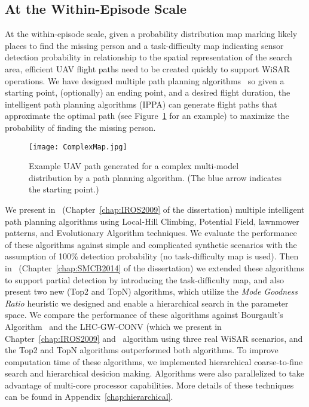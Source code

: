 \subsection{At the Within-Episode Scale}

At the within-episode scale, given a probability distribution map marking likely places to find the missing person and a task-difficulty map indicating sensor detection probability in relationship to the spatial representation of the search area, efficient UAV flight paths need to be created quickly to support WiSAR operations. We have designed multiple path planning algorithms~\cite{Lin2009UAV,Lin2014Hierarchical} so given a starting point, (optionally) an ending point, and a desired flight duration, the intelligent path planning algorithms (IPPA) can generate flight paths that approximate the optimal path (see Figure~\ref{path} for an example) to maximize the probability of finding the missing person.

\begin{figure}
\centering
\texttt{[image: ComplexMap.jpg]}
\caption{Example UAV path generated for a complex multi-model distribution by a path planning algorithm. (The blue arrow indicates the starting point.)}
\label{path}
\end{figure}

We present in~\cite{Lin2009UAV} (Chapter~\ref{chap:IROS2009} of the dissertation) multiple intelligent path planning algorithms using Local-Hill Climbing, Potential Field, lawnmower patterns, and Evolutionary Algorithm techniques. We evaluate the performance of these algorithms against simple and complicated synthetic scenarios with the assumption of 100\% detection probability (no task-difficulty map is used). Then in~\cite{Lin2014Hierarchical} (Chapter~\ref{chap:SMCB2014} of the dissertation) we extended these algorithms to support partial detection by introducing the task-difficulty map, and also present two new (Top2 and TopN) algorithms, which utilize the \textit{Mode Goodness Ratio} heuristic we designed and enable a hierarchical search in the parameter space. We compare the performance of these algorithms against Bourgault's Algorithm~\cite{Bourgault2006Optimal} and the LHC-GW-CONV (which we present in Chapter~\ref{chap:IROS2009} and~\cite{Lin2009UAV} algorithm using three real WiSAR scenarios, and the Top2 and TopN algorithms outperformed both algorithms. To improve computation time of these algorithms, we implemented hierarchical coarse-to-fine search and hierarchical desicion making. Algorithms were also parallelized to take advantage of multi-core processor capabilities. More details of these techniques can be found in Appendix~\ref{chap:hierarchical}.

